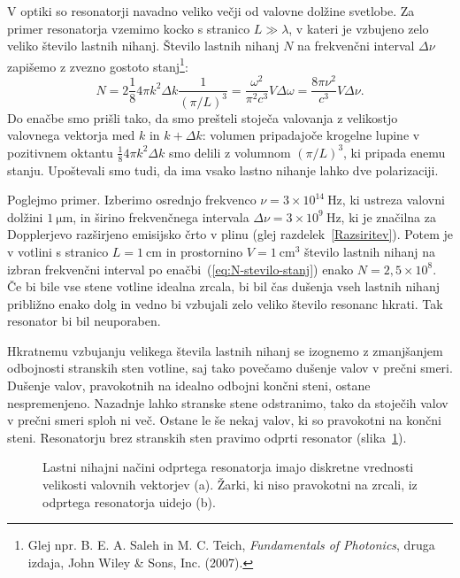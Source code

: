 V optiki so resonatorji navadno veliko večji
od valovne dolžine svetlobe. Za primer resonatorja vzemimo kocko s stranico $L\gg \lambda$, 
v kateri je vzbujeno zelo veliko število lastnih nihanj. Število lastnih nihanj $N$ 
na frekvenčni interval $\Delta \nu$ zapišemo z zvezno gostoto 
stanj\footnote{Glej npr. B. E. A. Saleh in M. C. Teich, 
{\it Fundamentals of Photonics}, druga izdaja, John Wiley \& Sons, Inc. (2007).}:
\begin{equation}
N=2 \frac{1}{8} 4\pi k^{2}\Delta k \frac{1}{(\pi/L)^3}=\frac{\omega^{2}}{\pi^{2}c^{3}}V\Delta\omega=
\frac{8\pi \nu^{2}}{c^{3}}V\Delta\nu.
\label{eq:N-stevilo-stanj}
\end{equation}
Do enačbe smo prišli tako, da smo prešteli stoječa valovanja z velikostjo
valovnega vektorja med $k$ in $k+\Delta k$: volumen pripadajoče krogelne lupine v pozitivnem oktantu
$\frac{1}{8} 4\pi k^{2}\Delta k$ smo delili z volumnom $(\pi/L)^3$, ki pripada enemu stanju. 
Upoštevali smo tudi, da ima vsako lastno nihanje lahko dve polarizaciji.

Poglejmo primer. Izberimo osrednjo frekvenco $\nu=3\times10^{14}~\si{\hertz}$, ki
ustreza valovni dolžini $1~\si{\micro\metre}$, in širino frekvenčnega
intervala $\Delta\nu=3\times10^{9}~\si{\hertz}$, ki je značilna za Dopplerjevo
razširjeno emisijsko črto v plinu (glej razdelek~\ref{Razsiritev}). 
Potem je v votlini s stranico $L=1~\si{\centi\metre}$ 
in prostornino $V=1~\si{\centi\metre^3}$ število lastnih nihanj na izbran frekvenčni interval 
po enačbi~(\ref{eq:N-stevilo-stanj}) enako
$N=2,5\times10^{8}$. Če bi bile vse stene votline idealna zrcala,
bi bil čas dušenja vseh lastnih nihanj približno enako dolg in vedno bi vzbujali
zelo veliko število resonanc hkrati. Tak resonator bi bil neuporaben.

Hkratnemu vzbujanju velikega števila lastnih nihanj se izognemo z zmanjšanjem odbojnosti
stranskih sten votline, saj tako povečamo dušenje valov v prečni smeri.
Dušenje valov, pravokotnih na idealno odbojni končni steni, ostane nespremenjeno.
Nazadnje lahko stranske stene odstranimo, tako da stoječih valov v prečni smeri
sploh ni več. Ostane le še nekaj valov, ki so pravokotni na končni
steni. Resonatorju brez stranskih sten  pravimo odprti resonator 
(slika~\ref{fig:Odprt_resonator}).
\begin{figure}[h]
\centering
\def\svgwidth{110truemm} 

\caption{Lastni nihajni načini odprtega resonatorja imajo diskretne vrednosti
velikosti valovnih vektorjev (a). Žarki, ki niso pravokotni na zrcali, 
iz odprtega resonatorja uidejo (b).}
\label{fig:Odprt_resonator}
\end{figure}

